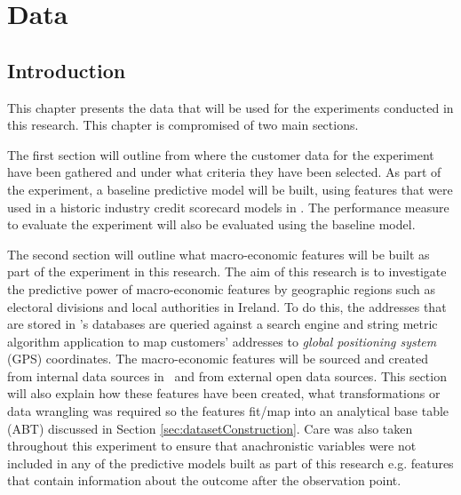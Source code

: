 
\chapter{Data} %

\label{Chapter3} %


\section{Introduction}
This chapter presents the data that will be used for the experiments conducted in this research. This chapter is compromised of two main sections. 

The first section will outline from where the customer data for the experiment have been gathered and under what criteria they have been selected. As part of the experiment, a baseline predictive model will be built, using features that were used in a historic industry credit scorecard models in \subjectname. The performance measure to evaluate the experiment will also be evaluated using the baseline model.

The second section will outline what macro-economic features will be built as part of the experiment in this research. The aim of this research is to investigate the predictive power of macro-economic features by geographic regions such as electoral divisions and local authorities in Ireland. To do this, the addresses that are stored in \subjectname's databases are queried against a search engine and string metric algorithm application to map customers' addresses to \textit{global positioning system} (GPS) coordinates. The macro-economic features will be sourced and created from internal data sources in \subjectname\ and from external open data sources. This section will also explain how these features have been created, what transformations or data wrangling was required so the features fit/map into an analytical base table (ABT) discussed in Section \ref{sec:datasetConstruction}. Care was also taken throughout this experiment to ensure that anachronistic variables were not included in any of the predictive models built as part of this research e.g. features that contain information about the outcome after the observation point. 

